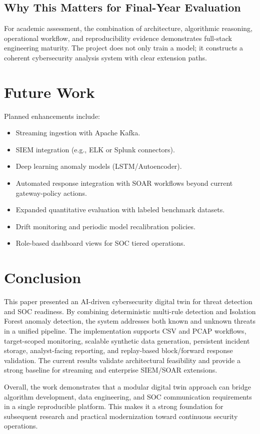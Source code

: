 \documentclass[conference]{IEEEtran}
\begin{document}
\subsection{Why This Matters for Final-Year Evaluation}
For academic assessment, the combination of architecture, algorithmic reasoning, operational workflow, and reproducibility evidence demonstrates full-stack engineering maturity. The project does not only train a model; it constructs a coherent cybersecurity analysis system with clear extension paths.

\section{Future Work}
Planned enhancements include:
\begin{itemize}
    \item Streaming ingestion with Apache Kafka.
    \item SIEM integration (e.g., ELK or Splunk connectors).
    \item Deep learning anomaly models (LSTM/Autoencoder).
    \item Automated response integration with SOAR workflows beyond current gateway-policy actions.
    \item Expanded quantitative evaluation with labeled benchmark datasets.
    \item Drift monitoring and periodic model recalibration policies.
    \item Role-based dashboard views for SOC tiered operations.
\end{itemize}

\section{Conclusion}
This paper presented an AI-driven cybersecurity digital twin for threat detection and SOC readiness. By combining deterministic multi-rule detection and Isolation Forest anomaly detection, the system addresses both known and unknown threats in a unified pipeline. The implementation supports CSV and PCAP workflows, target-scoped monitoring, scalable synthetic data generation, persistent incident storage, analyst-facing reporting, and replay-based block/forward response validation. The current results validate architectural feasibility and provide a strong baseline for streaming and enterprise SIEM/SOAR extensions.

Overall, the work demonstrates that a modular digital twin approach can bridge algorithm development, data engineering, and SOC communication requirements in a single reproducible platform. This makes it a strong foundation for subsequent research and practical modernization toward continuous security operations.



\end{document}

